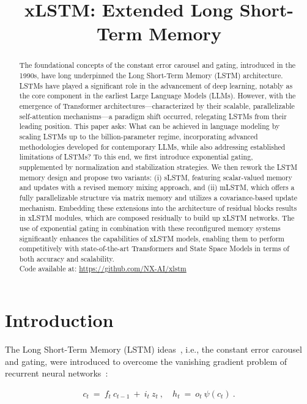 \title{xLSTM: Extended Long Short-Term Memory}

\begin{abstract}
The foundational concepts of the constant error carousel and gating, introduced in the 1990s, have long underpinned the Long Short-Term Memory (LSTM) architecture. LSTMs have played a significant role in the advancement of deep learning, notably as the core component in the earliest Large Language Models (LLMs). However, with the emergence of Transformer architectures—characterized by their scalable, parallelizable self-attention mechanisms—a paradigm shift occurred, relegating LSTMs from their leading position. This paper asks: What can be achieved in language modeling by scaling LSTMs up to the billion-parameter regime, incorporating advanced methodologies developed for contemporary LLMs, while also addressing established limitations of LSTMs? To this end, we first introduce exponential gating, supplemented by normalization and stabilization strategies. We then rework the LSTM memory design and propose two variants: (i) sLSTM, featuring scalar-valued memory and updates with a revised memory mixing approach, and (ii) mLSTM, which offers a fully parallelizable structure via matrix memory and utilizes a covariance-based update mechanism. Embedding these extensions into the architecture of residual blocks results in xLSTM modules, which are composed residually to build up xLSTM networks. The use of exponential gating in combination with these reconfigured memory systems significantly enhances the capabilities of xLSTM models, enabling them to perform competitively with state-of-the-art Transformers and State Space Models in terms of both accuracy and scalability.\\
Code available at: \url{https://github.com/NX-AI/xlstm}
\end{abstract}

\section{Introduction}
\label{sec:intro}

The Long Short-Term Memory (LSTM) ideas~\citep{Hochreiter:91,Hochreiter:97nips,Hochreiter:97}, i.e., the constant error carousel and gating, were introduced to overcome the vanishing gradient problem of recurrent neural networks~\citep{Hochreiter:91,Hochreiter:00book}:

\begin{align}
\label{eq:lstm_idea}
  c_t \ = \ f_t \ c_{t-1} \ + \ 
          i_t \  z_t \ , \quad  
          h_t \ = \ o_t \ \psi({c_t}) \ . 
\end{align}

